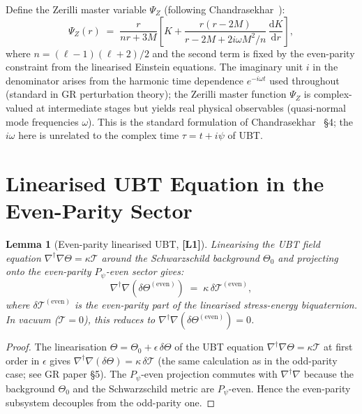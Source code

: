\documentclass[12pt,a4paper]{article}
\newtheorem{lemma}[theorem]{Lemma}
\theoremstyle{definition}
\theoremstyle{remark}
\newcommand{\Lone}{\textbf{[L1]}}
\newcommand{\calT}{\mathcal{T}}
\newcommand{\dd}{\mathrm{d}}
\begin{document}
Define the Zerilli master variable $\Psi_Z$ (following Chandrasekhar~\cite{chandrasekhar1983}):
\begin{equation}
\label{eq:PsiZ_def}
  \Psi_Z(r)
  \;=\;
  \frac{r}{nr + 3M}
  \left[K + \frac{r(r-2M)}{r-2M+2i\omega M^2/n}\,\frac{\dd K}{\dd r}\right],
\end{equation}
where $n = (\ell-1)(\ell+2)/2$ and the second term is fixed by the
even-parity constraint from the linearised Einstein equations.
The imaginary unit $i$ in the denominator arises from the harmonic time dependence
$e^{-i\omega t}$ used throughout (standard in GR perturbation theory);
the Zerilli master function $\Psi_Z$ is complex-valued at intermediate stages
but yields real physical observables (quasi-normal mode frequencies $\omega$).
This is the standard formulation of Chandrasekhar~\cite{chandrasekhar1983} §4;
the $i\omega$ here is unrelated to the complex time $\tau = t + i\psi$ of UBT.

\section{Linearised UBT Equation in the Even-Parity Sector}
\label{sec:linear_ubt}

\begin{lemma}[Even-parity linearised UBT, \Lone]
\label{lem:linearised}
Linearising the UBT field equation
$\nabla^\dagger\nabla\Theta = \kappa\calT$ around the Schwarzschild background
$\Theta_0$ and projecting onto the even-parity $P_\psi$-even sector gives:
\begin{equation}
\label{eq:lin_even}
  \nabla^\dagger\nabla(\delta\Theta^{(\mathrm{even})})
  \;=\;
  \kappa\,\delta\calT^{(\mathrm{even})},
\end{equation}
where $\delta\calT^{(\mathrm{even})}$ is the even-parity part of the
linearised stress-energy biquaternion.  In vacuum ($\calT = 0$), this reduces to
$\nabla^\dagger\nabla(\delta\Theta^{(\mathrm{even})}) = 0$.
\end{lemma}

\begin{proof}
The linearisation $\Theta = \Theta_0 + \epsilon\,\delta\Theta$ of the UBT
equation $\nabla^\dagger\nabla\Theta = \kappa\calT$ at first order in $\epsilon$
gives $\nabla^\dagger\nabla(\delta\Theta) = \kappa\,\delta\calT$ (the same
calculation as in the odd-parity case; see GR paper §5).
The $P_\psi$-even projection commutes with $\nabla^\dagger\nabla$ because
the background $\Theta_0$ and the Schwarzschild metric are $P_\psi$-even.
Hence the even-parity subsystem decouples from the odd-parity one.
\end{proof}
\end{document}

